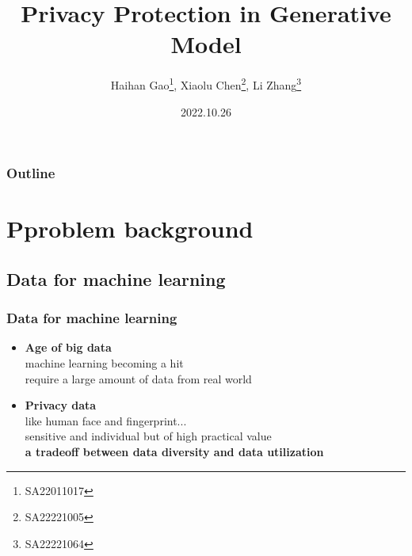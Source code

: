 \documentclass{beamer}
\title{Privacy Protection in Generative Model}
\author{Haihan Gao\thanks{SA22011017}, Xiaolu Chen\thanks{SA22221005}, Li Zhang\thanks{SA22221064}}
\institute{University of Science and Technology of China}
\date {2022.10.26}
\begin{document}
\begin{frame}
\titlepage
\end{frame}



\begin{frame}
	\frametitle{Outline}
  \renewcommand{\contentsname}{目录}
\tableofcontents
\end{frame}
\section{Pproblem background}
\subsection{Data for machine learning}
\begin{frame}
    \frametitle{Data for machine learning}
    \begin{itemize}
        \item \textbf{Age of big data}\\[5pt]
        machine learning becoming a hit\\
        require a large amount of data from real world\\[20pt]
        \item \textbf{Privacy data}\\[5pt]
        like human face and fingerprint...\\
        sensitive and individual but of high practical value\\
        \textbf{a tradeoff between data diversity and data utilization}
    \end{itemize}
\end{frame}
\end{document}
